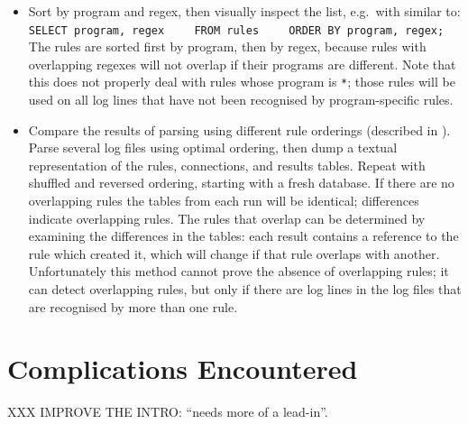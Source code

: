 \begin{itemize}

    \item Sort by program and regex, then visually inspect the list, e.g.\
        with  similar to:      \newline{}
        \verb!SELECT program, regex!        \newline{}
        \verb!    FROM rules!               \newline{}
        \verb!    ORDER BY program, regex;! \newline{}
        The rules are sorted first by program, then by regex, because rules
        with overlapping regexes will not overlap if their programs are
        different.  Note that this does not properly deal with rules whose
        program is \texttt{*}; those rules will be used on all log lines
        that have not been recognised by program-specific rules.

    \item Compare the results of parsing using different rule orderings
        (described in \sectionref{rule ordering for efficiency}).  Parse
        several log files using optimal ordering, then dump a textual
        representation of the rules, connections, and results tables.
        Repeat with shuffled and reversed ordering, starting with a fresh
        database.  If there are no overlapping rules the tables from each
        run will be identical; differences indicate overlapping rules.  The
        rules that overlap can be determined by examining the differences
        in the tables: each result contains a reference to the rule which
        created it, which will change if that rule overlaps with another.
        Unfortunately this method cannot prove the absence of overlapping
        rules; it can detect overlapping rules, but only if there are log
        lines in the log files that are recognised by more than one rule.

\end{itemize}

\section{Complications Encountered}

\label{complications}

XXX IMPROVE THE INTRO\@: ``needs more of a lead-in''.

